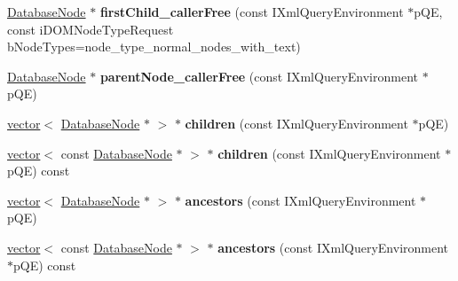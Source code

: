 \begin{DoxyCompactItemize}
\item 
\hypertarget{classgeneral__server_1_1DatabaseNode_a46c2b63423b0b24537afbde586a3a868}{\hyperlink{classgeneral__server_1_1DatabaseNode}{\-Database\-Node} $\ast$ {\bfseries first\-Child\-\_\-caller\-Free} (const \-I\-Xml\-Query\-Environment $\ast$p\-Q\-E, const i\-D\-O\-M\-Node\-Type\-Request b\-Node\-Types=node\-\_\-type\-\_\-normal\-\_\-nodes\-\_\-with\-\_\-text)}\label{classgeneral__server_1_1DatabaseNode_a46c2b63423b0b24537afbde586a3a868}

\item 
\hypertarget{classgeneral__server_1_1DatabaseNode_a2fd365f916690e38e9a5faac6948ebc3}{\hyperlink{classgeneral__server_1_1DatabaseNode}{\-Database\-Node} $\ast$ {\bfseries parent\-Node\-\_\-caller\-Free} (const \-I\-Xml\-Query\-Environment $\ast$p\-Q\-E)}\label{classgeneral__server_1_1DatabaseNode_a2fd365f916690e38e9a5faac6948ebc3}

\item 
\hypertarget{classgeneral__server_1_1DatabaseNode_a717ccbb0a71879057872f6a6769e7767}{\hyperlink{classvector}{vector}$<$ \hyperlink{classgeneral__server_1_1DatabaseNode}{\-Database\-Node} $\ast$ $>$ $\ast$ {\bfseries children} (const \-I\-Xml\-Query\-Environment $\ast$p\-Q\-E)}\label{classgeneral__server_1_1DatabaseNode_a717ccbb0a71879057872f6a6769e7767}

\item 
\hypertarget{classgeneral__server_1_1DatabaseNode_ad8b0018014cc0fd43339a809f70fe498}{\hyperlink{classvector}{vector}$<$ const \hyperlink{classgeneral__server_1_1DatabaseNode}{\-Database\-Node} $\ast$ $>$ $\ast$ {\bfseries children} (const \-I\-Xml\-Query\-Environment $\ast$p\-Q\-E) const }\label{classgeneral__server_1_1DatabaseNode_ad8b0018014cc0fd43339a809f70fe498}

\item 
\hypertarget{classgeneral__server_1_1DatabaseNode_ac2f8efa072084fe6ad6f77ef4ead8297}{\hyperlink{classvector}{vector}$<$ \hyperlink{classgeneral__server_1_1DatabaseNode}{\-Database\-Node} $\ast$ $>$ $\ast$ {\bfseries ancestors} (const \-I\-Xml\-Query\-Environment $\ast$p\-Q\-E)}\label{classgeneral__server_1_1DatabaseNode_ac2f8efa072084fe6ad6f77ef4ead8297}

\item 
\hypertarget{classgeneral__server_1_1DatabaseNode_ab17e387c81be7794dd413f94c2a5584f}{\hyperlink{classvector}{vector}$<$ const \hyperlink{classgeneral__server_1_1DatabaseNode}{\-Database\-Node} $\ast$ $>$ $\ast$ {\bfseries ancestors} (const \-I\-Xml\-Query\-Environment $\ast$p\-Q\-E) const }\label{classgeneral__server_1_1DatabaseNode_ab17e387c81be7794dd413f94c2a5584f}


\end{DoxyCompactItemize}
